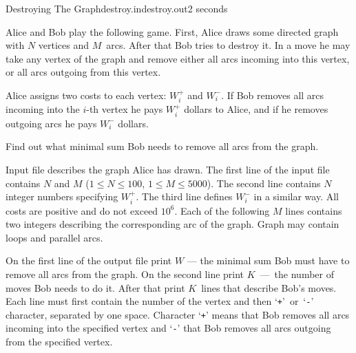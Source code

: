 \begin{problem}{Destroying The Graph}{destroy.in}{destroy.out}{2 seconds}
                 
Alice and Bob play the following game. First, Alice draws some 
directed graph with $N$ vertices and $M$~arcs. 
After that Bob tries to destroy it.
In a move he may take any vertex of the graph and remove
either all arcs incoming into this vertex, or all arcs outgoing
from this vertex. 

Alice assigns two costs to each vertex:
$W_i^+$ and $W_i^-$. If Bob removes all arcs
incoming into the $i$-th vertex he pays $W_i^+$ dollars to
Alice, and if he removes outgoing arcs he pays $W_i^-$ dollars.

Find out what minimal sum Bob needs to remove all
arcs from the graph.

\InputFile

Input file describes the graph Alice has drawn.
The first line of the input file contains $N$ and $M$ 
(${1\le N \le 100}$, ${1 \le M \le 5000}$). 
The second line contains $N$ integer numbers specifying $W_i^+$.
The third line defines $W_i^-$ in a similar way. All costs are positive
and do not exceed $10^6$.
Each of the following $M$ lines contains two integers describing the
corresponding arc of the graph. Graph may contain loops and parallel arcs.

\OutputFile

On the first line of the output file print $W$ --- the
minimal sum Bob must have to remove all arcs from the graph.
On the second line print $K$~---~the number of
moves Bob needs to do it. After that
print $K$~lines that describe Bob's moves. Each line must 
first contain the number of the vertex and then `\texttt{+}'~or~`\texttt{-}' 
character, separated by one space. Character `\texttt{+}' means 
that Bob removes all arcs incoming into the specified vertex and
`\texttt{-}' that Bob removes all arcs outgoing from the specified
vertex.

\Example

\begin{example}[*]
%
\end{example}

\end{problem}
